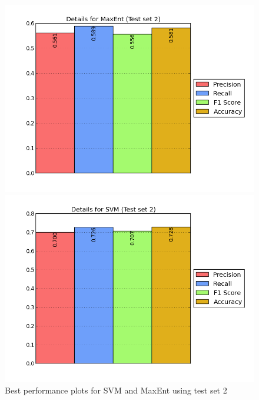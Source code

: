 \begin{figure}[htb]
	\centering
	\begin{minipage}{.45\linewidth}
		\includegraphics[width=\linewidth]{../img/plots/analysis/maxent_stats_best_diff_test.png}
	\end{minipage}
	\hspace{0.05\linewidth}
	\begin{minipage}{.45\linewidth}
		\includegraphics[width=\linewidth]{../img/plots/analysis/svm_stats_best_diff_test.png}
	\end{minipage}
	\label{fig:best_result_testset2}
	\caption[Best performance plots for SVM and MaxEnt for test set 2]{Best performance plots for SVM and MaxEnt using test set 2}
\end{figure}

